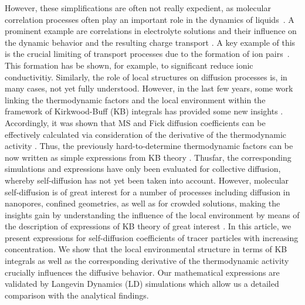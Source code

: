 \documentclass[aip,jcp,reprint]{revtex4-1}
\begin{document}
However, these simplifications are often not really expedient, as molecular correlation processes often play an important role in the dynamics of liquids~\cite{jones22a, bergstrom23a}. 
A prominent example are correlations in electrolyte solutions  and their influence on the dynamic behavior and the resulting charge transport \cite{kashyap11a,smiatek18a}.
A key example of this is the crucial limiting of transport processes due to the formation of ion pairs~\cite{marcus06a,vanderVegt16a,smiatek18a,smiatek20a,narayanan18a,smiatek20b,miranda20a,yang20a,krishnamoorthy18b,smiatek19a}.
This formation has be shown, for example, to significant reduce ionic conductivitiy\cite{schroder09a,krishnamoorthy16a,smiatek18a,smiatek20a,krishnamoorthy18c,nandy19a}.
Similarly, the role of local structures on diffusion processes is, in many cases, not yet fully understood. However, in the last few years, some work linking the thermodynamic factors and the local environment within the framework of Kirkwood-Buff (KB) integrals has provided some new insights \cite{bardow15a,guevara16a,janzen17a,liu11a,liu13a,rosenberger20a}. Accordingly, it was shown that MS and Fick diffusion coefficients can be effectively calculated via consideration of the derivative of the thermodynamic activity \cite{bardow15a,guevara16a,janzen17a,liu11a,liu13a,rosenberger20a}. Thus, the previously hard-to-determine thermodynamic factors can be now written as simple expressions from KB theory \cite{kirkwood51,ben13a,pierce08a,smith06,smiatek17a,zingrebe18b,simon22a}. Thusfar, the corresponding simulations and expressions have only been evaluated for collective diffusion, whereby self-diffusion has not yet been taken into account. However,  molecular self-diffusion is of great interest for a number of processes including diffusion in nanopores, confined geometries, as well as for crowded solutions, making the insights gain by understanding the influence of the local environment by means of the description of expressions of KB theory of great interest \cite{simon22a,jamali18a,jamali20a,roosen11a,dix08a}.
In this article, we present expressions for self-diffusion coefficients of tracer particles with increasing concentration. We show that the local environmental structure in terms of KB integrals as well as the corresponding derivative of the thermodynamic activity crucially influences the diffusive behavior.  Our mathematical expressions are validated by Langevin Dynamics (LD) simulations which allow us a detailed comparison with the analytical findings. \\
\end{document}
